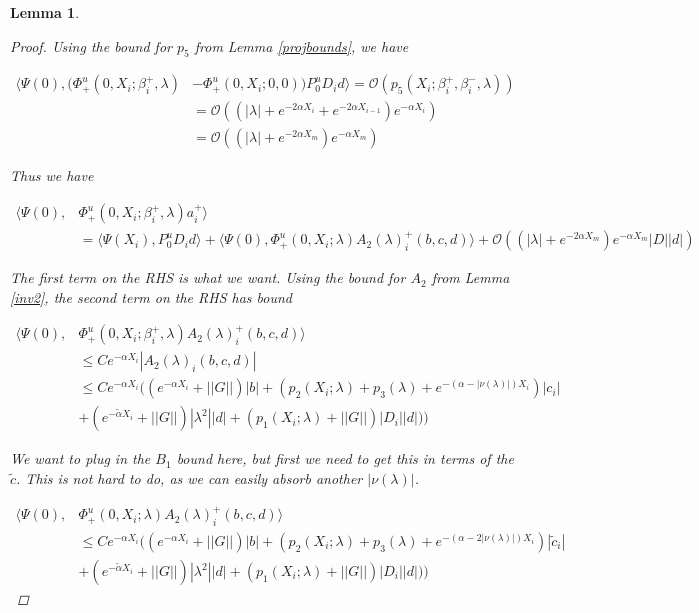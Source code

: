 \documentclass[12pt]{article}
\newtheorem{lemma}{Lemma}
\begin{document}
\begin{lemma}
\begin{proof}
Using the bound for $p_5$ from Lemma \ref{projbounds}, we have

\begin{align*}
\langle \Psi(0), (\Phi^u_+(0, X_i; \beta_i^+, \lambda) &- \Phi^u_+(0, X_i; 0, 0)) P^u_0 D_i d \rangle = \mathcal{O}(p_5(X_i; \beta_i^+, \beta_i^-, \lambda)) \\
&= \mathcal{O}((|\lambda| + e^{-2 \alpha X_i} + e^{-2 \alpha X_{i-1}} ) e^{-\alpha X_i}) \\
&= \mathcal{O}((|\lambda| + e^{-2 \alpha X_m}) e^{-\alpha X_m})
\end{align*}

Thus we have

\begin{align*}
\langle \Psi(0), &\Phi^u_+(0, X_i; \beta_i^+, \lambda) a_i^+ \rangle \\
&= \langle \Psi(X_i), P^u_0 D_i d \rangle 
+ \langle \Psi(0), \Phi^u_+(0, X_i; \lambda) A_2(\lambda)_i^+(b,c,d) \rangle 
+ \mathcal{O}((|\lambda| + e^{-2 \alpha X_m}) e^{-\alpha X_m}|D||d|)
\end{align*}

The first term on the RHS is what we want. Using the bound for $A_2$ from Lemma \ref{inv2}, the second term on the RHS has bound

\begin{align*}
\langle \Psi(0), &\Phi^u_+(0, X_i; \beta_i^+, \lambda) A_2(\lambda)_i^+(b,c,d) \rangle \\
&\leq C e^{-\alpha X_i} |A_2(\lambda)_i(b,c,d)| \\
&\leq C e^{-\alpha X_i}  \Big( (e^{-\alpha X_i} + ||G||)|b| + ( p_2(X_i; \lambda) + p_3(\lambda) + e^{-(\alpha - |\nu(\lambda)|)X_i} )|c_i| \\
&+ (e^{-\tilde{\alpha} X_i} + ||G||) |\lambda^2| |d| +(p_1(X_i; \lambda) + ||G|| )|D_i||d|) \Big)
\end{align*}

We want to plug in the $B_1$ bound here, but first we need to get this in terms of the $\tilde{c}$. This is not hard to do, as we can easily absorb another $|\nu(\lambda)|$.

\begin{align*}
\langle \Psi(0), &\Phi^u_+(0, X_i; \lambda) A_2(\lambda)_i^+(b,c,d) \rangle \\
&\leq C e^{-\alpha X_i} ( (e^{-\alpha X_i} + ||G||)|b| + ( p_2(X_i; \lambda) + p_3(\lambda) + e^{-(\alpha - 2|\nu(\lambda)|)X_i} )|\tilde{c}_i| \\
&+ (e^{-\tilde{\alpha} X_i} + ||G||) |\lambda^2| |d| +(p_1(X_i; \lambda) + ||G|| )|D_i||d|))
\end{align*}


\end{proof}
\end{lemma}
\end{document}
